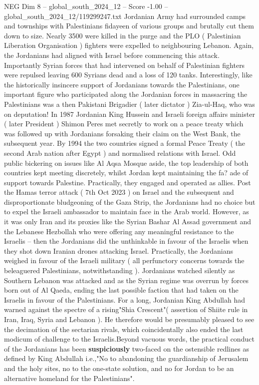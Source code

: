 \begin{textsample}{NEG Dim 8 – global\_south\_2024\_12 – Score -1.00 – global\_south\_2024\_12/119299247.txt}
Jordanian Army had surrounded camps and townships with Palestinians fidayeen of various groups and brutally cut them down to size.
Nearly 3500 were killed in the purge and the PLO ( Palestinian Liberation Organisation ) fighters were expelled to neighbouring Lebanon.
Again, the Jordanians had aligned with Israel before commencing this attack.
Importantly Syrian forces that had intervened on behalf of Palestinian fighters were repulsed leaving 600 Syrians dead and a loss of 120 tanks.
Interestingly, like the historically insincere support of Jordanians towards the Palestinians, one important figure who participated along the Jordanian forces in massacring the Palestinians was a then Pakistani Brigadier ( later dictator ) Zia-ul-Haq, who was on deputation!
In 1987 Jordanian King Hussein and Israeli foreign affairs minister ( later President ) Shimon Peres met secretly to work on a peace treaty which was followed up with Jordanians forsaking their claim on the West Bank, the subsequent year.
By 1994 the two countries signed a formal Peace Treaty ( the second Arab nation after Egypt ) and normalised relations with Israel.
Odd public bickering on issues like Al Aqsa Mosque aside, the top leadership of both countries kept meeting discretely, whilst Jordan kept maintaining the fa? ade of support towards Palestine.
Practically, they engaged and operated as allies.
Post the Hamas terror attack ( 7th Oct 2023 ) on Israel and the subsequent and disproportionate bludgeoning of the Gaza Strip, the Jordanians had no choice but to expel the Israeli ambassador to maintain face in the Arab world.
However, as it was only Iran and its proxies like the Syrian Bashar Al Assad government and the Lebanese Hezbollah who were offering any meaningful resistance to the Israelis -- then the Jordanians did the unthinkable in favour of the Israelis when they shot down Iranian drones attacking Israel.
Practically, the Jordanians weighed in favour of the Israeli military ( all perfunctory concerns towards the beleaguered Palestinians, notwithstanding ).
Jordanians watched silently as Southern Lebanon was attacked and as the Syrian regime was overrun by forces born out of Al Qaeda, ending the last possible faction that had taken on the Israelis in favour of the Palestinians.
For a long, Jordanian King Abdullah had warned against the spectre of a rising"Shia Crescent"( assertion of Shiite rule in Iran, Iraq, Syria and Lebanon ).
He therefore would be presumably pleased to see the decimation of the sectarian rivals, which coincidentally also ended the last modicum of challenge to the Israelis.Beyond vacuous words, the practical conduct of the Jordanians has been \textbf{suspiciously} two-faced on the ostensible redlines as defined by King Abdullah i.e.,"No to abandoning the guardianship of Jerusalem and the holy sites, no to the one-state solution, and no for Jordan to be an alternative homeland for the Palestinians".

\end{textsample}
